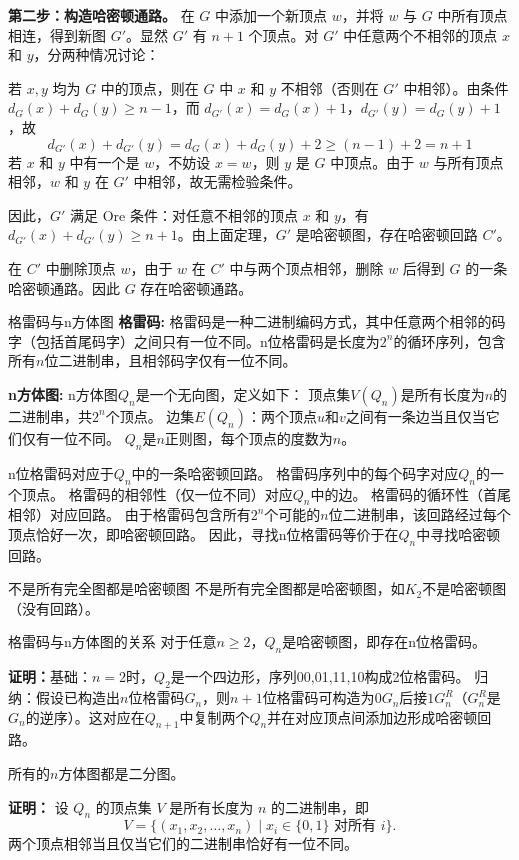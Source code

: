     \textbf{第二步：构造哈密顿通路。}
    在 $G$ 中添加一个新顶点 $w$，并将 $w$ 与 $G$ 中所有顶点相连，得到新图 $G'$。显然 $G'$ 有 $n+1$ 个顶点。对 $G'$ 中任意两个不相邻的顶点 $x$ 和 $y$，分两种情况讨论：
         
    若 $x, y$ 均为 $G$ 中的顶点，则在 $G$ 中 $x$ 和 $y$ 不相邻（否则在 $G'$ 中相邻）。由条件 $d_G(x) + d_G(y) \ge n-1$，而 $d_{G'}(x) = d_G(x) + 1$，$d_{G'}(y) = d_G(y) + 1$，故
        \[
        d_{G'}(x) + d_{G'}(y) = d_G(x) + d_G(y) + 2 \ge (n-1) + 2 = n+1
        \]
         若 $x$ 和 $y$ 中有一个是 $w$，不妨设 $x = w$，则 $y$ 是 $G$ 中顶点。由于 $w$ 与所有顶点相邻，$w$ 和 $y$ 在 $G'$ 中相邻，故无需检验条件。

    因此，$G'$ 满足 Ore 条件：对任意不相邻的顶点 $x$ 和 $y$，有 $d_{G'}(x) + d_{G'}(y) \ge n+1$。由上面定理，$G'$ 是哈密顿图，存在哈密顿回路 $C'$。

    在 $C'$ 中删除顶点 $w$，由于 $w$ 在 $C'$ 中与两个顶点相邻，删除 $w$ 后得到 $G$ 的一条哈密顿通路。因此 $G$ 存在哈密顿通路。
\begin{definition}{格雷码与n方体图}{}
\textbf{格雷码:}
格雷码是一种二进制编码方式，其中任意两个相邻的码字（包括首尾码字）之间只有一位不同。n位格雷码是长度为$2^n$的循环序列，包含所有$n$位二进制串，且相邻码字仅有一位不同。

\textbf{n方体图:}
n方体图$Q_n$是一个无向图，定义如下：
顶点集$V(Q_n)$是所有长度为$n$的二进制串，共$2^n$个顶点。  
边集$E(Q_n)$：两个顶点$u$和$v$之间有一条边当且仅当它们仅有一位不同。  
$Q_n$是$n$正则图，每个顶点的度数为$n$。
\end{definition}
n位格雷码对应于$Q_n$中的一条哈密顿回路。  
格雷码序列中的每个码字对应$Q_n$的一个顶点。  
格雷码的相邻性（仅一位不同）对应$Q_n$中的边。  
格雷码的循环性（首尾相邻）对应回路。  
由于格雷码包含所有$2^n$个可能的$n$位二进制串，该回路经过每个顶点恰好一次，即哈密顿回路。  
因此，寻找n位格雷码等价于在$Q_n$中寻找哈密顿回路。
\begin{theorem}{不是所有完全图都是哈密顿图}{}
    不是所有完全图都是哈密顿图，如$K_2$不是哈密顿图（没有回路）。
\end{theorem}
\begin{theorem}{格雷码与n方体图的关系}{}
    对于任意$n \geqslant 2$，$Q_n$是哈密顿图，即存在n位格雷码。
\end{theorem}
\textbf{证明：}基础：$n=2$时，$Q_2$是一个四边形，序列00,01,11,10构成2位格雷码。  
归纳：假设已构造出$n$位格雷码$G_n$，则$n+1$位格雷码可构造为$0G_n$后接$1G_n^R$（$G_n^R$是$G_n$的逆序）。这对应在$Q_{n+1}$中复制两个$Q_n$并在对应顶点间添加边形成哈密顿回路。
\begin{theorem}{}{}
    所有的$n$方体图都是二分图。
\end{theorem}
\textbf{证明：}
    设 $Q_n$ 的顶点集 $V$ 是所有长度为 $n$ 的二进制串，即
    \[
    V = \{ (x_1, x_2, \dots, x_n) \mid x_i \in \{0, 1\} \text{ 对所有 } i \}.
    \]
    两个顶点相邻当且仅当它们的二进制串恰好有一位不同。

